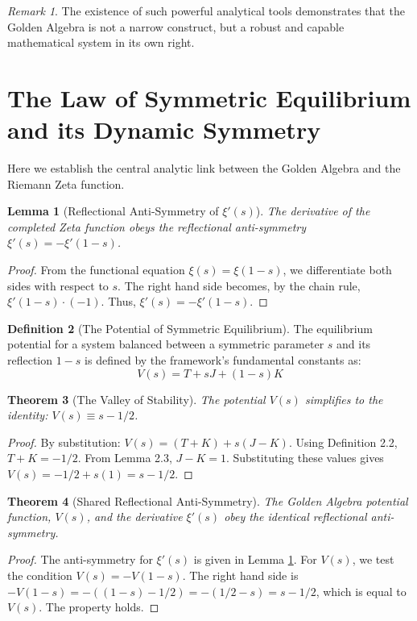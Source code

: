 \documentclass{article}
\theoremstyle{plain}
\newtheorem{theorem}{Theorem}[section]
\newtheorem{lemma}[theorem]{Lemma}
\theoremstyle{definition}
\newtheorem{definition}[theorem]{Definition}
\theoremstyle{remark}
\newtheorem*{remark}{Remark}
\begin{document}
\begin{remark}
The existence of such powerful analytical tools demonstrates that the Golden Algebra is not a narrow construct, but a robust and capable mathematical system in its own right.
\end{remark}

\section{The Law of Symmetric Equilibrium and its Dynamic Symmetry}
Here we establish the central analytic link between the Golden Algebra and the Riemann Zeta function.

\begin{lemma}[Reflectional Anti-Symmetry of $\xi'(s)$]
\label{thm:xi_anti_symmetry}
The derivative of the completed Zeta function obeys the reflectional anti-symmetry $\xi'(s) = -\xi'(1-s)$.
\end{lemma}
\begin{proof}
From the functional equation $\xi(s) = \xi(1-s)$, we differentiate both sides with respect to $s$. The right hand side becomes, by the chain rule, $\xi'(1-s) \cdot (-1)$. Thus, $\xi'(s) = -\xi'(1-s)$.
\end{proof}

\begin{definition}[The Potential of Symmetric Equilibrium]
The equilibrium potential for a system balanced between a symmetric parameter $s$ and its reflection $1-s$ is defined by the framework's fundamental constants as:
$$V(s) = T + sJ + (1-s)K$$
\end{definition}

\begin{theorem}[The Valley of Stability]
The potential $V(s)$ simplifies to the identity: $V(s) \equiv s - 1/2$.
\end{theorem}
\begin{proof}
By substitution: $V(s) = (T+K) + s(J-K)$. Using Definition 2.2, $T+K = -1/2$. From Lemma 2.3, $J-K=1$. Substituting these values gives $V(s) = -1/2 + s(1) = s - 1/2$.
\end{proof}

\begin{theorem}[Shared Reflectional Anti-Symmetry]
The Golden Algebra potential function, $V(s)$, and the derivative $\xi'(s)$ obey the identical reflectional anti-symmetry.
\end{theorem}
\begin{proof}
The anti-symmetry for $\xi'(s)$ is given in Lemma \ref{thm:xi_anti_symmetry}. For $V(s)$, we test the condition $V(s) = -V(1-s)$. The right hand side is $-V(1-s) = -((1-s) - 1/2) = -(1/2 - s) = s - 1/2$, which is equal to $V(s)$. The property holds.
\end{proof}
\end{document}
